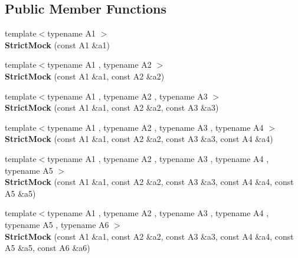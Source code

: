 \subsection*{Public Member Functions}
\begin{DoxyCompactItemize}
\item 
{\footnotesize template$<$typename A1 $>$ }\\{\bfseries Strict\+Mock} (const A1 \&a1)\hypertarget{classtesting_1_1StrictMock_a42db27ba0af29804db8589676817aff8}{}\label{classtesting_1_1StrictMock_a42db27ba0af29804db8589676817aff8}

\item 
{\footnotesize template$<$typename A1 , typename A2 $>$ }\\{\bfseries Strict\+Mock} (const A1 \&a1, const A2 \&a2)\hypertarget{classtesting_1_1StrictMock_a345933f3f1a10de381a508f93e680c6b}{}\label{classtesting_1_1StrictMock_a345933f3f1a10de381a508f93e680c6b}

\item 
{\footnotesize template$<$typename A1 , typename A2 , typename A3 $>$ }\\{\bfseries Strict\+Mock} (const A1 \&a1, const A2 \&a2, const A3 \&a3)\hypertarget{classtesting_1_1StrictMock_acc25729cd85a3a412106863894a30fe7}{}\label{classtesting_1_1StrictMock_acc25729cd85a3a412106863894a30fe7}

\item 
{\footnotesize template$<$typename A1 , typename A2 , typename A3 , typename A4 $>$ }\\{\bfseries Strict\+Mock} (const A1 \&a1, const A2 \&a2, const A3 \&a3, const A4 \&a4)\hypertarget{classtesting_1_1StrictMock_a6b42ef1460901ea91a2a09f44ae8fba2}{}\label{classtesting_1_1StrictMock_a6b42ef1460901ea91a2a09f44ae8fba2}

\item 
{\footnotesize template$<$typename A1 , typename A2 , typename A3 , typename A4 , typename A5 $>$ }\\{\bfseries Strict\+Mock} (const A1 \&a1, const A2 \&a2, const A3 \&a3, const A4 \&a4, const A5 \&a5)\hypertarget{classtesting_1_1StrictMock_a2019f4e86224b2adbb9e9326bc175c50}{}\label{classtesting_1_1StrictMock_a2019f4e86224b2adbb9e9326bc175c50}

\item 
{\footnotesize template$<$typename A1 , typename A2 , typename A3 , typename A4 , typename A5 , typename A6 $>$ }\\{\bfseries Strict\+Mock} (const A1 \&a1, const A2 \&a2, const A3 \&a3, const A4 \&a4, const A5 \&a5, const A6 \&a6)\hypertarget{classtesting_1_1StrictMock_a17b452e1e2f57d7d10f7209587376eef}{}\label{classtesting_1_1StrictMock_a17b452e1e2f57d7d10f7209587376eef}


\end{DoxyCompactItemize}
